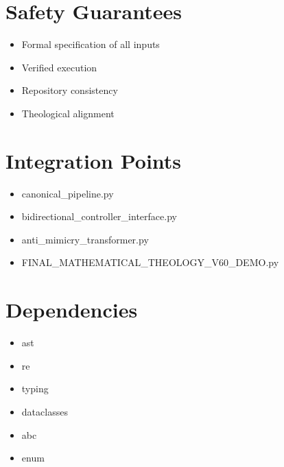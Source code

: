 \documentclass[12pt]{article}
\begin{document}
\section{Safety Guarantees}

\begin{itemize}
    \item Formal specification of all inputs
    \item Verified execution
    \item Repository consistency
    \item Theological alignment
\end{itemize}

\section{Integration Points}

\begin{itemize}
    \item canonical_pipeline.py
    \item bidirectional_controller_interface.py
    \item anti_mimicry_transformer.py
    \item FINAL_MATHEMATICAL_THEOLOGY_V60_DEMO.py
\end{itemize}

\section{Dependencies}

\begin{itemize}
    \item ast
    \item re
    \item typing
    \item dataclasses
    \item abc
    \item enum
\end{itemize}
\end{document}

